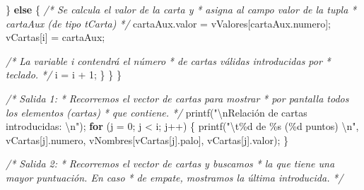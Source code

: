 \documentclass[
]{book}
\newenvironment{Shaded}{\begin{snugshade}}{\end{snugshade}}
\newcommand{\CommentTok}[1]{\textcolor[rgb]{0.56,0.35,0.01}{\textit{#1}}}
\newcommand{\ControlFlowTok}[1]{\textcolor[rgb]{0.13,0.29,0.53}{\textbf{#1}}}
\newcommand{\DecValTok}[1]{\textcolor[rgb]{0.00,0.00,0.81}{#1}}
\newcommand{\NormalTok}[1]{#1}
\newcommand{\SpecialCharTok}[1]{\textcolor[rgb]{0.00,0.00,0.00}{#1}}
\newcommand{\StringTok}[1]{\textcolor[rgb]{0.31,0.60,0.02}{#1}}
\begin{document}
\begin{Shaded}
\begin{Highlighting}[]
\NormalTok{            \} }\ControlFlowTok{else}\NormalTok{ \{}
                \CommentTok{/* Se calcula el valor de la carta y}
\CommentTok{                 * asigna al campo valor de la tupla}
\CommentTok{                 * cartaAux (de tipo tCarta)}
\CommentTok{                 */}
\NormalTok{                cartaAux.valor = vValores[cartaAux.numero];}
\NormalTok{                vCartas[i] = cartaAux;}
                
                \CommentTok{/* La variable \textquotesingle{}i\textquotesingle{} contendrá el número}
\CommentTok{                 * de cartas válidas introducidas por}
\CommentTok{                 * teclado.}
\CommentTok{                 */}
\NormalTok{                i = i + }\DecValTok{1}\NormalTok{;}
\NormalTok{            \}}
\NormalTok{        \}}
\NormalTok{    \}}
    
    \CommentTok{/* Salida 1:}
\CommentTok{     * Recorremos el vector de cartas para mostrar}
\CommentTok{     * por pantalla todos los elementos (cartas)}
\CommentTok{     * que contiene.}
\CommentTok{     */}
\NormalTok{    printf(}\StringTok{"}\SpecialCharTok{\textbackslash{}n}\StringTok{Relación de cartas introducidas: }\SpecialCharTok{\textbackslash{}n}\StringTok{"}\NormalTok{);}
    \ControlFlowTok{for}\NormalTok{ (j = }\DecValTok{0}\NormalTok{; j \textless{} i; j++) \{}
\NormalTok{        printf(}\StringTok{"}\SpecialCharTok{\textbackslash{}t}\StringTok{\%d de \%s (\%d puntos) }\SpecialCharTok{\textbackslash{}n}\StringTok{"}\NormalTok{, vCartas[j].numero, vNombres[vCartas[j].palo], vCartas[j].valor);}
\NormalTok{    \}}
    
    \CommentTok{/* Salida 2:}
\CommentTok{     * Recorremos el vector de cartas y buscamos}
\CommentTok{     * la que tiene una mayor puntuación. En caso}
\CommentTok{     * de empate, mostramos la última introducida.}
\CommentTok{     */}


\end{Highlighting}
\end{Shaded}
\end{document}
